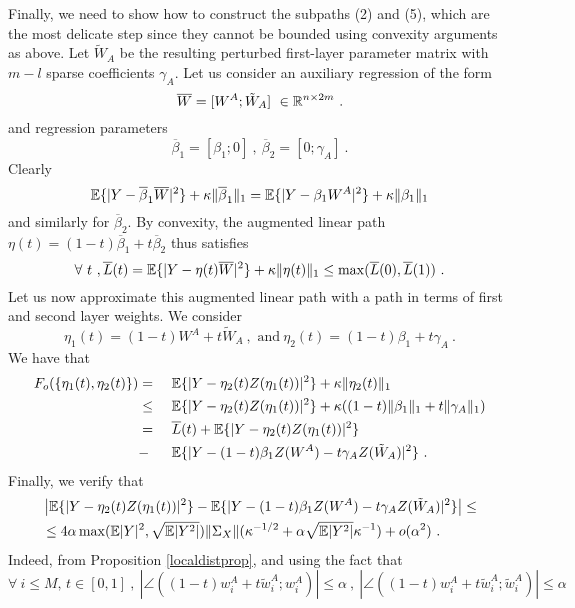 Finally, we need to show how to construct the subpaths (2) and (5), which are the most delicate step since they cannot be bounded using
convexity arguments as above. 
Let $\tilde{W}_A$ be the resulting perturbed first-layer parameter matrix 
with $m-l$ sparse coefficients $\gamma_A$.
Let us consider an auxiliary regression of the form 
$$\overline{W} = [ W^A ; \tilde{W}_A] ~\in {\mathbb{R}}^{n \times 2m}~.$$
and regression parameters 
$$\overline{\beta}_1 = [ \beta_1; 0]~,~\overline{\beta}_2 = [0; \gamma_A]~.$$
Clearly 
$${\mathbb{E}}\{ | Y - \overline{\beta}_1 \overline{W} |^2 \} + \kappa \| \overline{\beta}_1 \|_1 = {\mathbb{E}}\{ | Y - \beta_1 W^A |^2 \} + \kappa \| {\beta}_1 \|_1 $$ 
 and similarly for $\overline{\beta}_2$. By convexity, the augmented linear path $\eta(t) =(1- t) \overline{\beta}_1 + t \overline{\beta}_2$ thus satisfies 
$$\forall~t~,\overline{L}(t) = {\mathbb{E}}\{ | Y - \eta(t) \overline{W} |^2 \} + \kappa \| \eta(t) \|_1 \leq \max(\overline{L}(0), \overline{L}(1))~. $$
Let us now approximate this augmented linear path with a path in terms of first and second layer weights. 
We consider
$$\eta_1(t) = (1-t) W^A + t \tilde{W}_A~,\text{ and}~\eta_2(t) = (1- t) {\beta}_1 + t \gamma_A~.$$
We have that 
\begin{alignat}{3}
\label{bub1}
F_{o}(\{ \eta_1(t), \eta_2(t) \}) &= &&\ {\mathbb{E}} \{ | Y - \eta_2(t) Z(\eta_1(t) ) |^2 \} + \kappa \| \eta_2(t) \|_1  \\ 
&\leq  &&\ {\mathbb{E}} \{ | Y - \eta_2(t) Z(\eta_1(t) ) |^2 \} + \kappa(  ( 1-t) \| {\beta}_1\|_1 + t \| \gamma_A \|_1 ) \nonumber \\
& = &&\ \overline{L}(t) + {\mathbb{E}} \{ | Y - \eta_2(t) Z(\eta_1(t) ) |^2 \} \nonumber \\
& - &&\ {\mathbb{E}} \{ | Y - (1-t) \beta_1 Z(W^A) - t \gamma_A Z(\tilde{W}_A) |^2 \} ~.
\end{alignat}
Finally, we verify that
{\small 
\begin{eqnarray}
\label{bub2}
& \left | {\mathbb{E}} \{ | Y - \eta_2(t) Z(\eta_1(t) ) |^2 \}  - {\mathbb{E}} \{ | Y - (1-t) \beta_1 Z(W^A) - t \gamma_A Z(\tilde{W}_A) |^2 \} \right|  \leq\\
& \leq 4  \alpha \max({\mathbb{E}} |Y|^2, \sqrt{{\mathbb{E}}|Y^2|}) \| \Sigma_X \| ( \kappa^{-1/2} + \alpha \sqrt{{\mathbb{E}}|Y^2|} \kappa^{-1}) + o(\alpha^2)~. \nonumber
\end{eqnarray}}
Indeed, from Proposition \ref{localdistprop}, and using the fact that 
$$\forall~i\leq M,\, t \in [0,1]~,~\left| \angle( (1-t)w^A_i + t \tilde{w}^A_i ; w^A_i) \right| \leq \alpha~,~ \left| \angle( (1-t)w^A_i + t \tilde{w}^A_i ; \tilde{w}^A_i) \right| \leq \alpha $$
